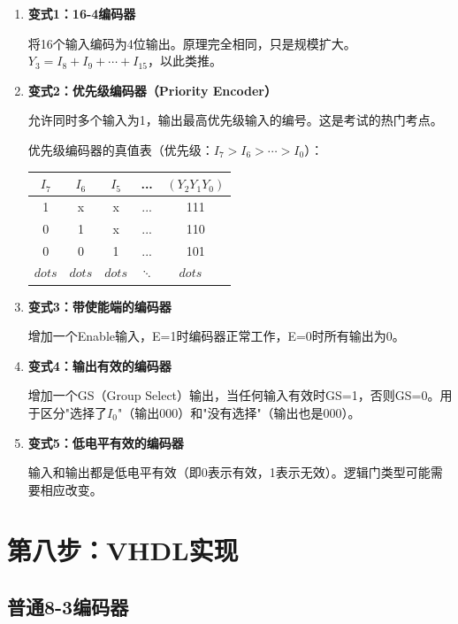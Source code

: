 \begin{enumerate}
  \item \textbf{变式1：16-4编码器}

  将16个输入编码为4位输出。原理完全相同，只是规模扩大。$Y_3 = I_8 + I_9 + \cdots + I_{15}$，以此类推。

  \item \textbf{变式2：优先级编码器（Priority Encoder）}

  允许同时多个输入为1，输出最高优先级输入的编号。这是考试的热门考点。

  优先级编码器的真值表（优先级：$I_7 > I_6 > \cdots > I_0$）：

  \begin{center}
  \begin{tabular}{|c|c|c|c|c|}
  \hline
  $I_7$ & $I_6$ & $I_5$ & ... & $(Y_2 Y_1 Y_0)$ \\
  \hline
  1 & x & x & ... & 111 \\
  0 & 1 & x & ... & 110 \\
  0 & 0 & 1 & ... & 101 \\
  $dots$ & $dots$ & $dots$ & $\ddots$ & $dots$ \

  \hline
  \end{tabular}
  \end{center}

  \item \textbf{变式3：带使能端的编码器}

  增加一个Enable输入，E=1时编码器正常工作，E=0时所有输出为0。

  \item \textbf{变式4：输出有效的编码器}

  增加一个GS（Group Select）输出，当任何输入有效时GS=1，否则GS=0。用于区分"选择了$I_0$"（输出000）和"没有选择"（输出也是000）。

  \item \textbf{变式5：低电平有效的编码器}

  输入和输出都是低电平有效（即0表示有效，1表示无效）。逻辑门类型可能需要相应改变。
\end{enumerate}

\section{第八步：VHDL实现}

\subsection{普通8-3编码器}

